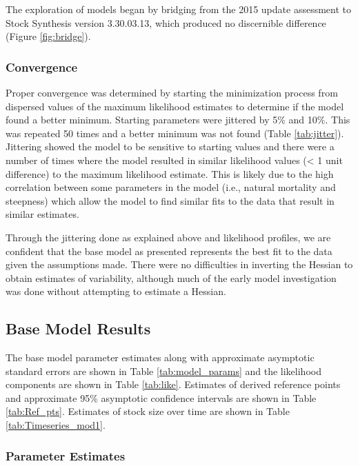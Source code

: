 \documentclass[12pt,]{article}
\begin{document}
The exploration of models began by bridging from the 2015 update
assessment to Stock Synthesis version 3.30.03.13, which produced no
discernible difference (Figure \ref{fig:bridge}).

\subsubsection{Convergence}\label{convergence}

Proper convergence was determined by starting the minimization process
from dispersed values of the maximum likelihood estimates to determine
if the model found a better minimum. Starting parameters were jittered
by 5\% and 10\%. This was repeated 50 times and a better minimum was not
found (Table \ref{tab:jitter}). Jittering showed the model to be
sensitive to starting values and there were a number of times where the
model resulted in similar likelihood values (\textless{} 1 unit
difference) to the maximum likelihood estimate. This is likely due to
the high correlation between some parameters in the model (i.e., natural
mortality and steepness) which allow the model to find similar fits to
the data that result in similar estimates.

Through the jittering done as explained above and likelihood profiles,
we are confident that the base model as presented represents the best
fit to the data given the assumptions made. There were no difficulties
in inverting the Hessian to obtain estimates of variability, although
much of the early model investigation was done without attempting to
estimate a Hessian.

\subsection{Base Model Results}\label{base-model-results}

The base model parameter estimates along with approximate asymptotic
standard errors are shown in Table \ref{tab:model_params} and the
likelihood components are shown in Table \ref{tab:like}. Estimates of
derived reference points and approximate 95\% asymptotic confidence
intervals are shown in Table \ref{tab:Ref_pts}. Estimates of stock size
over time are shown in Table \ref{tab:Timeseries_mod1}.

\subsubsection{Parameter Estimates}\label{parameter-estimates}
\end{document}
